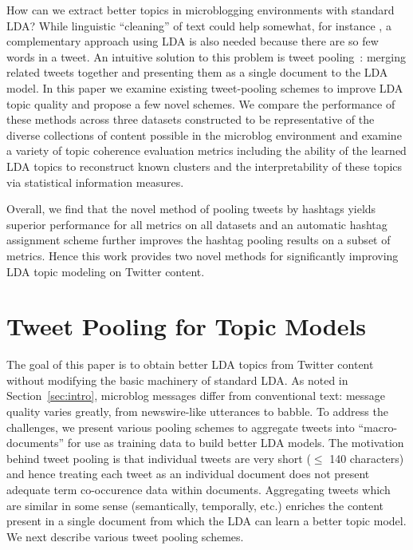 \documentclass{sig-alternate}
\begin{document}
How can we extract better topics in microblogging environments with
standard LDA?  While linguistic ``cleaning'' of text could help
somewhat, for instance \cite{Han2012}, a complementary approach using
LDA is also needed because there are so few words in a tweet.  An
intuitive solution to this problem is tweet
pooling~\cite{Weng2010wsdm,hong}: merging related tweets together and
presenting them as a single document to the LDA model.  In this paper
we examine existing tweet-pooling schemes to improve LDA topic quality
and propose a few novel schemes.  We compare the performance of these
methods across three datasets constructed to be representative of the
diverse collections of content possible in the microblog environment
and examine a variety of topic coherence evaluation metrics including
the ability of the learned LDA topics to reconstruct known clusters
and the interpretability of these topics via statistical information
measures.

Overall, we find that the novel method of pooling tweets by hashtags
yields superior performance for all metrics on all datasets and an
automatic hashtag assignment scheme further improves the hashtag
pooling results on a subset of metrics.  Hence this work provides two
novel methods for significantly improving LDA topic modeling on
Twitter content.



\section{Tweet Pooling for Topic Models}

\label{sec:pooling}

The goal of this paper is to obtain better LDA topics from Twitter
content without modifying the basic machinery of standard LDA.  As
noted in Section~\ref{sec:intro}, microblog messages differ from
conventional text: message quality varies greatly, from newswire-like
utterances to babble.  To address the challenges, we present various
pooling schemes to aggregate tweets into ``macro-documents'' for use
as training data to build better LDA models.  The motivation behind
tweet pooling is that individual tweets are very short ($\leq$ 140
characters) and hence treating each tweet as an individual document
does not present adequate term co-occurence data within documents.
Aggregating tweets which are similar in some sense (semantically,
temporally, etc.) enriches the content present in a single document
from which the LDA can learn a better topic model.  We next describe
various tweet pooling schemes.
\end{document}
